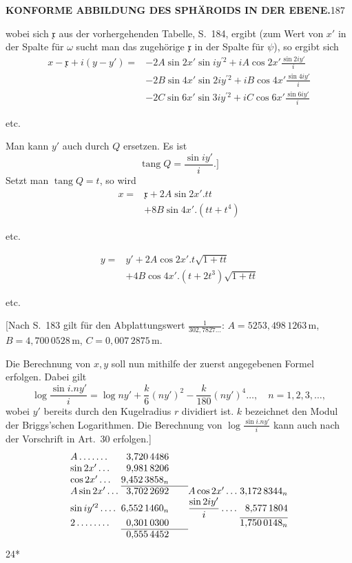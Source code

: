 \par\clearpage
\noindent\null\hfill{\small\textbf{KONFORME ABBILDUNG DES SPHÄROIDS IN DER EBENE.}}\hfill187\par\medskip
\noindent wobei sich \(\mathfrak{x}\) aus der vorhergehenden Tabelle, S.~184, ergibt (zum Wert von \(x'\) in der Spalte für \(\omega\) sucht man das zugehörige \(\mathfrak{x}\) in der Spalte für \(\psi\)), so ergibt sich
\[
\begin{aligned}
x-\mathfrak{x}+i(y-y')={}&-2A\sin2x'\sin iy^{\prime 2}+iA\cos2x'\frac{\sin2iy'}{i}\\
&-2B\sin4x'\sin2iy^{\prime 2}+iB\cos4x'\frac{\sin4iy'}{i}\\
&-2C\sin6x'\sin3iy^{\prime 2}+iC\cos6x'\frac{\sin6iy'}{i}
\end{aligned}
\]
{\centering etc.\par}
Man kann \(y'\) auch durch \(Q\) ersetzen. Es ist
\[\operatorname{tang}Q=\frac{\sin iy'}{i}.]\]
Setzt man \(\operatorname{tang}Q=t\), so wird
\[
\begin{aligned}
x={}&\mathfrak{x}+2A\sin2x'.tt\\
&+8B\sin4x'.(tt+t^4)
\end{aligned}
\]
{\centering etc.\par}
\[
\begin{aligned}
y={}&y'+2A\cos2x'.t\sqrt{1+tt}\\
&+4B\cos4x'.(t+2t^3)\sqrt{1+tt}
\end{aligned}
\]
{\centering etc.\par}
[Nach S.~183 gilt für den Abplattungswert \(\frac1{302{,}7827\ldots}\): \(A=5253{,}498\,1263\,\mathrm{m}\), \(B=4{,}700\,0528\,\mathrm{m}\), \(C=0{,}007\,2875\,\mathrm{m}\).

Die Berechnung von \(x,y\) soll nun mithilfe der zuerst angegebenen Formel erfolgen. Dabei gilt
\[
\log\frac{\sin i.ny'}{i}=\log ny'+\frac{k}{6}(ny')^2-\frac{k}{180}(ny')^4\ldots,\quad n=1,2,3,\ldots,
\]
\noindent wobei \(y'\) bereits durch den Kugelradius \(r\) dividiert ist. \(k\) bezeichnet den Modul der Briggs'schen Logarithmen. Die Berechnung von \(\log\frac{\sin i.ny'}{i}\) kann auch nach der Vorschrift in Art.~30 erfolgen.]
\[
\begin{array}{@{}l@{\;}r@{\qquad}l@{\;}r@{}}
A\,.\,.\,.\,.\,.\,.\,.&3{,}720\,4486&&\\
\sin2x'\,.\,.\,.&9{,}981\,8206&&\\
\cos2x'\,.\,.\,.&9{,}452\,3858_n&&\\\cline{2-2}
A\sin2x'\,.\,.\,.&3{,}702\,2692&A\cos2x'\,.\,.\,.&3{,}172\,8344_n\\
\sin iy^{\prime 2}\,.\,.\,.\,.&6{,}552\,1460_n&\dfrac{\sin2iy'}{i}\,.\,.\,.\,.&8{,}577\,1804\\\cline{4-4}
2\,.\,.\,.\,.\,.\,.\,.\,.&0{,}301\,0300&&1{,}750\,0148_n\\\cline{2-2}
&0{,}555\,4452&&
\end{array}
\]
\noindent\null\hfill{\small24*}\hspace*{.12\linewidth}\par

